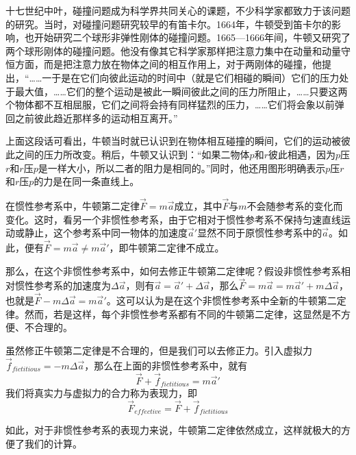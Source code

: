 \begin{prove}
    十七世纪中叶，碰撞问题成为科学界共同关心的课题，不少科学家都致力于该问题的研究。当时，对碰撞问题研究较早的有笛卡尔。1664年，牛顿受到笛卡尔的影响，也开始研究二个球形非弹性刚体的碰撞问题。1665—1666年间，牛顿又研究了两个球形刚体的碰撞问题。他没有像其它科学家那样把注意力集中在动量和动量守恒方面，而是把注意力放在物体之间的相互作用上，对于两刚体的碰撞，他提出，“……一于是在它们向彼此运动的时间中（就是它们相碰的瞬间）它们的压力处于最大值，……它们的整个运动是被此一瞬间彼此之间的压力所阻止，……只要这两个物体都不互相屈服，它们之间将会持有同样猛烈的压力，……它们将会象以前弹回之前彼此趋近那样多的运动相互离开。”

    上面这段话可看出，牛顿当时就已认识到在物体相互碰撞的瞬间，它们的运动被彼此之间的压力所改变。稍后，牛顿又认识到：“如果二物体$p$和$r$彼此相遇，因为$p$压$r$和$r$压$p$是一样大小，所以二者的阻力是相同的。”同时，他还用图形明确表示$p$压$r$和$r$压$p$的力是在同一条直线上。
\end{prove}
\begin{prove}
	在惯性参考系中，牛顿第二定律$\vec{F}=m\vec{a}$成立，其中$\vec{F}$与$m$不会随参考系的变化而变化。这时，看另一个非惯性参考系，由于它相对于惯性参考系不保持匀速直线运动或静止，这个参考系中同一物体的加速度$\vec{a}'$显然不同于原惯性参考系中的$\vec{a}$。如此，便有$\vec{F}=m\vec{a}\ne m\vec{a}'$，即牛顿第二定律不成立。
	
	那么，在这个非惯性参考系中，如何去修正牛顿第二定律呢？假设非惯性参考系相对惯性参考系的加速度为$\Delta \vec{a}$，则有$\vec{a}=\vec{a}'+\Delta \vec{a}$，那么$\vec{F}=m\vec{a}=m\vec{a}'+m\Delta \vec{a}$，也就是$\vec{F}-m\Delta \vec{a}=m\vec{a}'$。这可以认为是在这个非惯性参考系中全新的牛顿第二定律。然而，若是这样，每个非惯性参考系都有不同的牛顿第二定律，这显然是不方便、不合理的。
	
	虽然修正牛顿第二定律是不合理的，但是我们可以去修正力。引入虚拟力$\vec{f}_{fictitious}=-m\Delta \vec{a}$，那么在上面的非惯性参考系中，就有
	\[\vec{F}+\vec{f}_{fictitious}=m\vec{a}'\]
	我们将真实力与虚拟力的合力称为表现力，即
	\[\vec{F}_{effective}=\vec{F}+\vec{f}_{fictitious}\]
	
	如此，对于非惯性参考系的表现力来说，牛顿第二定律依然成立，这样就极大的方便了我们的计算。
\end{prove}
